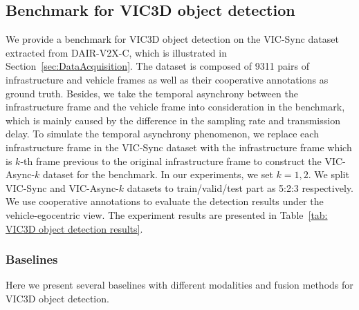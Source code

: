 \subsection{Benchmark for VIC3D object detection}
We provide a benchmark for VIC3D object detection on the VIC-Sync dataset extracted from DAIR-V2X-C, which is illustrated in Section~\ref{sec:DataAcquisition}. The dataset is composed of 9311 pairs of infrastructure and vehicle frames as well as their cooperative annotations as ground truth. 
Besides, we take the temporal asynchrony between the infrastructure frame and the vehicle frame into consideration in the benchmark, which is mainly caused by the difference in the sampling rate and transmission delay.
To simulate the temporal asynchrony phenomenon, we replace each infrastructure frame in the VIC-Sync dataset with the infrastructure frame which is $k$-th frame previous to the original infrastructure frame to construct the VIC-Async-$k$ dataset for the benchmark. In our experiments, we set $k=1, 2$.
We split VIC-Sync and VIC-Async-$k$ datasets to train/valid/test part as 5:2:3 respectively.
We use cooperative annotations to evaluate the detection results under the vehicle-egocentric view.
The experiment results are presented in Table~\ref{tab: VIC3D object detection results}.

\subsubsection{Baselines}\label{sec: vic3d baselines}
Here we present several baselines with different modalities and fusion methods for VIC3D object detection.

